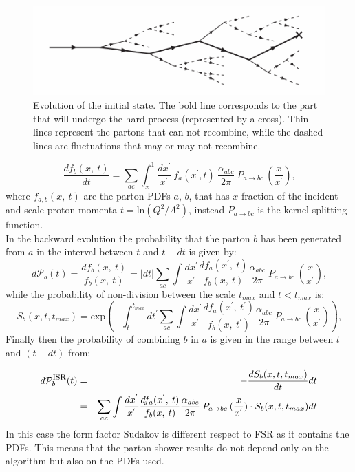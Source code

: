 \begin{figure}
\centering
\includegraphics[scale= 0.8]{../Cap3/Fig_MC/isr}
\caption{ Evolution of the initial state. The bold line corresponds to the part that will undergo the hard process (represented by a cross). Thin lines represent the partons that can not recombine, while the dashed lines are fluctuations that may or may not recombine.  }
\label{isr}
\end{figure}

\begin{equation}
  \frac{d f_b(x, \:t)}{dt}= \sum_{ac} \int_x ^1 \frac{d x^{'}}{x^{'}} \: f_a(x^{'},t) \:\frac{\alpha_{abc}}{2\pi} \:P_{a \rightarrow bc} \:(\frac{x}{x^{'}}) \mbox{,}\end{equation}
where $f_{a,b}(x, \:t)$ are the parton PDFs  $a$, $b$, that has $ x $ fraction of the incident and scale proton momenta $t=\mbox{ln}(Q^2/ \Lambda^2) $, instead $P_{a \rightarrow bc}$ is the kernel splitting function.\\
In the backward evolution the probability that the parton $ b $ has been generated from $ a $ in the interval between $ t $ and $ t-dt $ is given by:
\begin{equation}
d\mathcal{P}_{b}(t)=\frac{d f_b(x, \:t) }{ f_b(x, \:t)}= |dt| \sum_{ac}  \int  \frac{d x^{'}}{x^{'}} \frac{d f_a(x^{'}, \:t) }{ f_b(x, \:t)} \frac{\alpha_{abc}}{2\pi}          \:P_{a \rightarrow bc} \:(\frac{x}{x^{'}})      \mbox{,}\end{equation}
while the probability of non-division between the scale $t_{max}$ and $t<t_{max}$ is:
\begin{equation}
S_b (x,t,t_{max})=   \mbox{exp} \left( - \int_t ^{t_{max}} dt^{'} \sum_{ac}  \int  \frac{d x^{'}}{x^{'}} \frac{d f_a(x^{'}, \:t^{'}) }{ f_b(x, \:t^{'})} \frac{\alpha_{abc}}{2\pi}          \:P_{a \rightarrow bc} \:(\frac{x}{x^{'}}) \right)     \mbox{,}\end{equation} 
Finally then the probability of combining $ b $ in $ a $ is given in the range between $ t $ and $ (t-dt) $ from:

\begin{eqnarray}
d \mathcal{P}_{b}^{\mbox{\footnotesize{ISR}}}(t) &=& - \frac{d S_b (x,t,t_{max})}{dt} dt \nonumber \\
&=&  \sum_{ac}  \int  \frac{d x^{'}}{x^{'}} \frac{d f_a(x^{'}, \:t) }{ f_b(x, \:t)} \frac{\alpha_{abc}}{2\pi}          \:P_{a \rightarrow bc} \:(\frac{x}{x^{'}})  \cdot S_b (x,t,t_{max}) dt \end{eqnarray}
In this case the form factor Sudakov is different respect to FSR as it contains the PDFs.
This means that the parton shower results do not depend only on the algorithm but also on the PDFs used.


